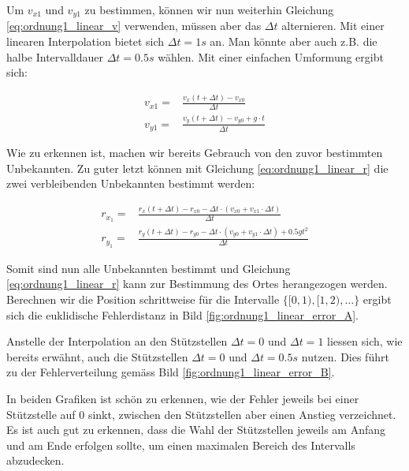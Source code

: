 Um $v_{x1}$ und $v_{y1}$ zu bestimmen, können wir nun weiterhin Gleichung \ref{eq:ordnung1_linear_v} verwenden, müssen aber das $\Delta t$ alternieren. Mit einer linearen Interpolation bietet sich $\Delta t = 1s$ an. Man könnte aber auch z.B. die halbe Intervalldauer $\Delta t = 0.5s$ wählen. Mit einer einfachen Umformung ergibt sich:

\begin{equation}
\label{eq:ordnung1_linear_solutionPart2}
\begin{aligned}
v_{x1} =& \frac{v_x(t + \Delta t) - v_{x0}}{\Delta t} \\
v_{y1} =& \frac{v_y(t + \Delta t) - v_{y0} + g \cdot t}{\Delta t}
\end{aligned}
\end{equation}

Wie zu erkennen ist, machen wir bereits Gebrauch von den zuvor bestimmten Unbekannten. Zu guter letzt können mit Gleichung \ref{eq:ordnung1_linear_r} die zwei verbleibenden Unbekannten bestimmt werden:

\begin{equation}
\label{eq:ordnung1_linear_solutionPart3}
\begin{aligned}
r_{x_1} =& \frac{r_x(t + \Delta t) - r_{x0} - \Delta t \cdot(v_{x0} + v_{x1}  \cdot \Delta t)}{\Delta t} \\
r_{y_1} =& \frac{r_y(t + \Delta t) - r_{y0} - \Delta t \cdot(v_{y0} + v_{y1}  \cdot \Delta t) + 0.5gt^2}{\Delta t}
\end{aligned}
\end{equation}


Somit sind nun alle Unbekannten bestimmt und Gleichung \eqref{eq:ordnung1_linear_r} kann zur Bestimmung des Ortes herangezogen werden. Berechnen wir die Position schrittweise für die Intervalle $\{[0,1), [1, 2), \dots\}$ ergibt sich die euklidische Fehlerdistanz in Bild \eqref{fig:ordnung1_linear_error_A}.

Anstelle der Interpolation an den Stützstellen $\Delta t = 0$ und $\Delta t = 1$ liessen sich, wie bereits erwähnt, auch die Stützstellen $\Delta t = 0$ und $\Delta t = 0.5s$ nutzen. Dies führt zu der Fehlerverteilung gemäss Bild \ref{fig:ordnung1_linear_error_B}.

In beiden Grafiken ist schön zu erkennen, wie der Fehler jeweils bei einer Stützstelle auf $0$ sinkt, zwischen den Stützstellen aber einen Anstieg verzeichnet. Es ist auch gut zu erkennen, dass die Wahl der Stützstellen jeweils am Anfang und am Ende erfolgen sollte, um einen maximalen Bereich des Intervalls abzudecken. 

